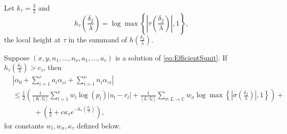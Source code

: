 Let $k_{\tau} = \frac{3}{2}$ and 
\[h_{\tau}\left(\frac{\delta_2}{\lambda}\right) =\log \max \left\{ \left|\tau\left(\frac{\delta_2}{\lambda}\right)\right|, 1\right\},\]
the local height at $\tau$ in the summand of $h\left(\frac{\delta_2}{\lambda}\right)$.

\begin{lemma}\label{lem:archellest}
Suppose $(x,y, n_1, \dots, n_{\nu}, a_1, \dots, a_r)$ is a solution of \eqref{eq:EfficientSunit}. If ${h_{\tau} \left(\frac{\delta_2}{\lambda}\right) > c_{\tau}}$, then  
\begin{align*}
&\left|\alpha_0+\sum_{i = 1}^r a_i \alpha_{\varepsilon i} + \sum_{i = 1}^{\nu} n_i \alpha_{\gamma i}\right|\\
	& \leq \frac{1}{2}\left(\frac{1}{[K:\mathbb{Q}]}\sum_{l = 1}^{\nu}w_l \log(p_l)|u_l - r_l| + \frac{1}{[L:\mathbb{Q}]}\sum_{\sigma :L \to \mathbb{C}} w_{\sigma}\log \max \left\{ \left|\sigma\left(\frac{\delta_2}{\lambda}\right)\right|, 1\right\} \right) + \\
	& \quad \quad \quad + \left(\frac{1}{2} + c\kappa_{\tau}e^{-h_{\tau}\left(\frac{\delta_2}{\lambda}\right)}\right),
\end{align*} 
for constants $w_l, w_{\sigma}, \kappa_{\tau}$ defined below. 
\end{lemma}


